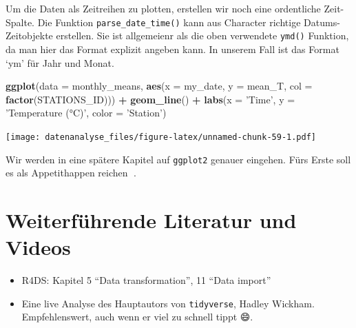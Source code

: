 \documentclass[]{book}
\newenvironment{Shaded}{\begin{snugshade}}{\end{snugshade}}
\newcommand{\DataTypeTok}[1]{\textcolor[rgb]{0.13,0.29,0.53}{#1}}
\newcommand{\KeywordTok}[1]{\textcolor[rgb]{0.13,0.29,0.53}{\textbf{#1}}}
\newcommand{\NormalTok}[1]{#1}
\newcommand{\OperatorTok}[1]{\textcolor[rgb]{0.81,0.36,0.00}{\textbf{#1}}}
\newcommand{\StringTok}[1]{\textcolor[rgb]{0.31,0.60,0.02}{#1}}
\begin{document}
Um die Daten als Zeitreihen zu plotten, erstellen wir noch eine ordentliche Zeit-Spalte. Die Funktion \texttt{parse\_date\_time()} kann aus Character richtige Datums-Zeitobjekte erstellen. Sie ist allgemeienr als die oben verwendete \texttt{ymd()} Funktion, da man hier das Format explizit angeben kann. In unserem Fall ist das Format `ym' für Jahr und Monat.

\begin{Shaded}
\end{Shaded}

\begin{Shaded}
\begin{Highlighting}[]
\KeywordTok{ggplot}\NormalTok{(}\DataTypeTok{data =}\NormalTok{ monthly_means, }\KeywordTok{aes}\NormalTok{(}\DataTypeTok{x =}\NormalTok{ my_date, }\DataTypeTok{y =}\NormalTok{ mean_T, }
            \DataTypeTok{col =} \KeywordTok{factor}\NormalTok{(STATIONS_ID))) }\OperatorTok{+}\StringTok{ }
\StringTok{  }\KeywordTok{geom_line}\NormalTok{() }\OperatorTok{+}\StringTok{ }
\StringTok{  }\KeywordTok{labs}\NormalTok{(}\DataTypeTok{x =} \StringTok{'Time'}\NormalTok{, }\DataTypeTok{y =} \StringTok{'Temperature (°C)'}\NormalTok{, }\DataTypeTok{color =} \StringTok{'Station'}\NormalTok{)}
\end{Highlighting}
\end{Shaded}

\texttt{[image: datenanalyse\_files/figure-latex/unnamed-chunk-59-1.pdf]}

Wir werden in eine spätere Kapitel auf \texttt{ggplot2} genauer eingehen. Fürs Erste soll es als Appetithappen reichen 🍰.

\hypertarget{weiterfuxfchrende-literatur-und-videos}{%
\section{Weiterführende Literatur und Videos}\label{weiterfuxfchrende-literatur-und-videos}}

\begin{itemize}
\item
  R4DS: Kapitel 5 ``Data transformation'', 11 ``Data import''
\item
  Eine live Analyse des Hauptautors von \texttt{tidyverse}, Hadley Wickham. Empfehlenswert, auch wenn er viel zu schnell tippt 😄.
\end{itemize}
\end{document}
